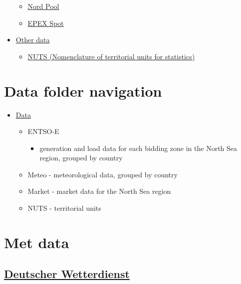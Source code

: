 \begin{itemize}
  \begin{itemize}
  \tightlist
  \item
    \protect\hyperlink{nord-pool}{Nord Pool}
  \item
    \protect\hyperlink{epex-spot}{EPEX Spot}
  \end{itemize}
\item
  \protect\hyperlink{other-data}{Other data}

  \begin{itemize}
  \tightlist
  \item
    \protect\hyperlink{nuts-nomenclature-of-territorial-units-for-statistics}{NUTS
    (Nomenclature of territorial units for statistics)}
  \end{itemize}
\end{itemize}

\hypertarget{data-folder-navigation}{%
\section{Data folder navigation}\label{data-folder-navigation}}

\begin{itemize}
\tightlist
\item
  \href{https://drive.google.com/drive/folders/1_3Y30j_c-4iai0WuhcrysXHYdZ4F2AKB}{Data}

  \begin{itemize}
  \tightlist
  \item
    ENTSO-E

    \begin{itemize}
    \tightlist
    \item
      generation and load data for each bidding zone in the North Sea
      region, grouped by country
    \end{itemize}
  \item
    Meteo - meteorological data, grouped by country
  \item
    Market - market data for the North Sea region
  \item
    NUTS - territorial units
  \end{itemize}
\end{itemize}

\hypertarget{met-data}{%
\section{Met data}\label{met-data}}

\hypertarget{deutscher-wetterdienst}{%
\subsection{\texorpdfstring{\href{https://www.dwd.de/EN/climate_environment/cdc/cdc_node.html}{Deutscher
Wetterdienst}}{Deutscher Wetterdienst}}\label{deutscher-wetterdienst}}

